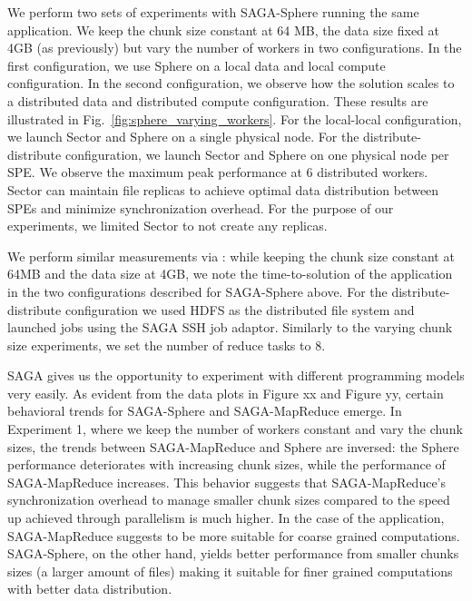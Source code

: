 \documentclass[3p,twocolumn]{elsarticle}
\begin{document}
We perform two sets of experiments with SAGA-Sphere running the same
\wc application.  We keep the chunk size constant at 64 MB, the
data size fixed at 4GB (as previously) but vary the number of workers
in two configurations. In the first configuration, we use Sphere on a
local data and local compute configuration. In the second
configuration, we observe how the solution scales to a distributed
data and distributed compute configuration. These results are
illustrated in Fig.~\ref{fig:sphere_varying_workers}.  For the local-local
configuration, we launch Sector and Sphere on a single physical node.
For the distribute-distribute configuration, we launch Sector and
Sphere on one physical node per SPE.  We observe the maximum peak
performance at 6 distributed workers. Sector can maintain file
replicas to achieve optimal data distribution between SPEs and
minimize synchronization overhead. For the purpose of our experiments,
we limited Sector to not create any replicas.

We perform similar measurements via \sagamapreduce: while keeping the
chunk size constant at 64MB and the data size at 4GB, we note the
time-to-solution of the \wc application in the two
configurations described for SAGA-Sphere above.  For the
distribute-distribute configuration we used HDFS as the distributed
file system and launched jobs using the SAGA SSH job adaptor.
Similarly to the varying chunk size experiments, we set the number of
reduce tasks to 8.  

SAGA gives us the opportunity to experiment with different programming models very easily. 
As evident from the data plots in Figure xx and Figure yy, certain behavioral 
trends for SAGA-Sphere and SAGA-MapReduce emerge.  In Experiment 1, where we keep the 
number of workers constant and vary the chunk sizes, the trends between 
SAGA-MapReduce and Sphere are inversed: the Sphere performance deteriorates with 
increasing chunk sizes, while the performance of SAGA-MapReduce increases. This behavior
suggests that SAGA-MapReduce's synchronization overhead to manage smaller 
chunk sizes compared to the speed up achieved through parallelism is much higher. 
In the case of the \wc application, SAGA-MapReduce suggests to be more 
suitable for coarse grained computations. SAGA-Sphere, on the other hand, yields 
better performance from smaller chunks sizes (a larger amount of files) making it 
suitable for finer grained computations with better data distribution.
\end{document}

